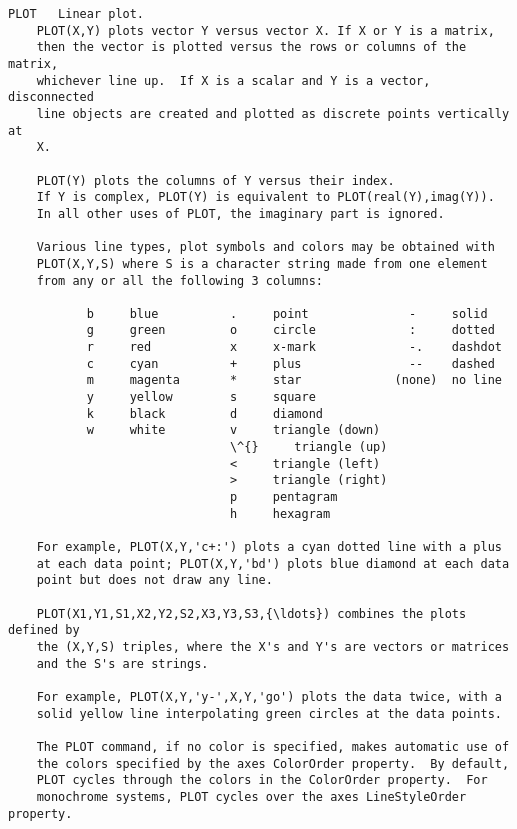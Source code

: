 \documentclass[11pt]{article}
\begin{document}
    \begin{Verbatim}[commandchars=\\\{\}]
 PLOT   Linear plot. 
    PLOT(X,Y) plots vector Y versus vector X. If X or Y is a matrix,
    then the vector is plotted versus the rows or columns of the matrix,
    whichever line up.  If X is a scalar and Y is a vector, disconnected
    line objects are created and plotted as discrete points vertically at
    X.
 
    PLOT(Y) plots the columns of Y versus their index.
    If Y is complex, PLOT(Y) is equivalent to PLOT(real(Y),imag(Y)).
    In all other uses of PLOT, the imaginary part is ignored.
 
    Various line types, plot symbols and colors may be obtained with
    PLOT(X,Y,S) where S is a character string made from one element
    from any or all the following 3 columns:
 
           b     blue          .     point              -     solid
           g     green         o     circle             :     dotted
           r     red           x     x-mark             -.    dashdot 
           c     cyan          +     plus               --    dashed   
           m     magenta       *     star             (none)  no line
           y     yellow        s     square
           k     black         d     diamond
           w     white         v     triangle (down)
                               \^{}     triangle (up)
                               <     triangle (left)
                               >     triangle (right)
                               p     pentagram
                               h     hexagram
                          
    For example, PLOT(X,Y,'c+:') plots a cyan dotted line with a plus 
    at each data point; PLOT(X,Y,'bd') plots blue diamond at each data 
    point but does not draw any line.
 
    PLOT(X1,Y1,S1,X2,Y2,S2,X3,Y3,S3,{\ldots}) combines the plots defined by
    the (X,Y,S) triples, where the X's and Y's are vectors or matrices 
    and the S's are strings.  
 
    For example, PLOT(X,Y,'y-',X,Y,'go') plots the data twice, with a
    solid yellow line interpolating green circles at the data points.
 
    The PLOT command, if no color is specified, makes automatic use of
    the colors specified by the axes ColorOrder property.  By default,
    PLOT cycles through the colors in the ColorOrder property.  For
    monochrome systems, PLOT cycles over the axes LineStyleOrder property.
 

\end{Verbatim}
\end{document}
